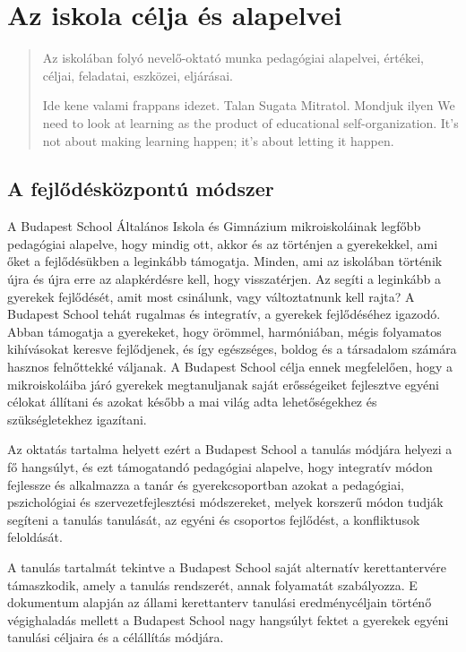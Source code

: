 \chapter{Az iskola célja és alapelvei}
\label{sec:alapelvek}

\begin{quote}
  Az iskolában folyó nevelő-oktató munka pedagógiai alapelvei, értékei, céljai, feladatai, eszközei, eljárásai.

  Ide kene valami frappans idezet. Talan Sugata Mitratol. Mondjuk ilyen We need to look at learning as the product of educational self-organization. It’s not about making learning happen; it’s about letting it happen.



\end{quote}


\section{A fejlődésközpontú módszer}
A Budapest School Általános Iskola és Gimnázium mikroiskoláinak legfőbb
pedagógiai alapelve, hogy mindig ott, akkor és az történjen a
gyerekekkel, ami őket a fejlődésükben a leginkább támogatja. Minden, ami
az iskolában történik újra és újra erre az alapkérdésre kell, hogy
visszatérjen. Az segíti a leginkább a gyerekek fejlődését, amit most
csinálunk, vagy változtatnunk kell rajta? A Budapest School
tehát rugalmas és integratív, a gyerekek fejlődéséhez igazodó. Abban
támogatja a gyerekeket, hogy örömmel, harmóniában, mégis folyamatos
kihívásokat keresve fejlődjenek, és így egészséges, boldog és a
társadalom számára hasznos felnőttekké váljanak. A Budapest School
célja ennek megfelelően, hogy a mikroiskoláiba járó gyerekek
megtanuljanak saját erősségeiket fejlesztve egyéni célokat állítani és
azokat később a mai világ adta lehetőségekhez és szükségletekhez
igazítani.

Az oktatás tartalma helyett ezért a Budapest School a tanulás módjára
helyezi a fő hangsúlyt, és ezt támogatandó pedagógiai alapelve, hogy
integratív módon fejlessze és alkalmazza a tanár és gyerekcsoportban
azokat a pedagógiai, pszichológiai és szervezetfejlesztési módszereket,
melyek korszerű módon tudják segíteni a tanulás tanulását, az egyéni és
csoportos fejlődést, a konfliktusok feloldását.

A tanulás tartalmát tekintve a Budapest School saját alternatív
kerettantervére támaszkodik, amely a tanulás rendszerét, annak
folyamatát szabályozza. E dokumentum alapján az állami kerettanterv
tanulási eredménycéljain történő végighaladás mellett a Budapest School
nagy hangsúlyt fektet a gyerekek egyéni tanulási céljaira és a
célállítás módjára.

